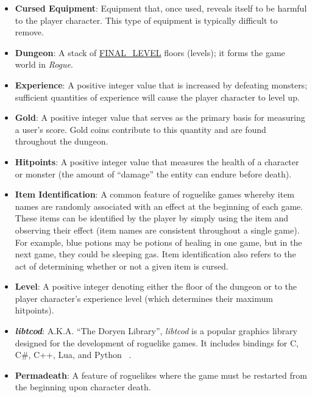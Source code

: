\documentclass[12pt, titlepage]{article}
\begin{document}
	\begin{itemize}
		\item \textbf{Cursed Equipment}: Equipment that, once used, reveals itself to be harmful to the player character.  This type of equipment is typically difficult to remove.

		\item \textbf{Dungeon}: A stack of \hyperref[symbolicParameters]{FINAL\_LEVEL} floors (levels); it forms the game world in \textit{Rogue}.

		\item \textbf{Experience}: A positive integer value that is increased by defeating monsters; sufficient quantities of experience will cause the player character to level up.

		\item \textbf{Gold}: A positive integer value that serves as the primary basis for measuring a user's score.  Gold coins contribute to this quantity and are found throughout the dungeon.

		\item \textbf{Hitpoints}: A positive integer value that measures the health of a character or monster (the amount of ``damage'' the entity can endure before death).

		\item \textbf{Item Identification}: A common feature of roguelike games whereby item names are randomly associated with an effect at the beginning of each game.  These items can be identified by the player by simply using the item and observing their effect (item names are consistent throughout a single game).  For example, blue potions may be potions of healing in one game, but in the next game, they could be sleeping gas.  Item identification also refers to the act of determining whether or not a given item is cursed.

		\item \textbf{Level}: A positive integer denoting either the floor of the dungeon or to the player character's experience level (which determines their maximum hitpoints).

		\item \textbf{\textit{libtcod}}: A.K.A. ``The Doryen Library'', \textit{libtcod} is a popular graphics library designed for the development of roguelike games.  It includes bindings for C, C\#, C++, Lua, and Python ~\citep{LibtcodHome}.

		\item \textbf{Permadeath}: A feature of roguelikes where the game must be restarted from the beginning upon character death.


\end{itemize}
\end{document}
